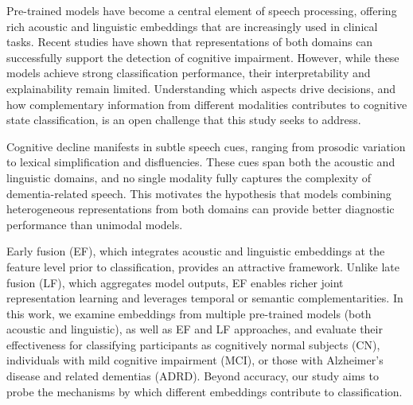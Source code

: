 \documentclass{article}
\begin{document}
{%




Pre-trained models have become a central element of speech processing, offering rich acoustic and linguistic embeddings that are increasingly used in clinical tasks. Recent studies have shown that representations of both domains can successfully support the detection of cognitive impairment. However, while these models achieve strong classification performance, their interpretability and explainability remain limited. Understanding which aspects drive decisions, and how complementary information from different modalities contributes to cognitive state classification, is an open challenge that this study seeks to address. %

Cognitive decline manifests in subtle speech cues, ranging from prosodic variation to lexical simplification and disfluencies. These cues span both the acoustic and linguistic domains, and no single modality fully captures the complexity of dementia-related speech. This motivates the hypothesis that models combining heterogeneous representations from both domains can provide better diagnostic performance than unimodal models. %

Early fusion (EF), which integrates acoustic and linguistic embeddings at the feature level prior to classification, provides an attractive framework. Unlike late fusion (LF), which aggregates model outputs, EF enables richer joint representation learning and leverages temporal or semantic complementarities. In this work, we examine embeddings from multiple pre-trained models (both acoustic and linguistic), as well as EF and LF approaches, and evaluate their effectiveness for classifying participants as cognitively normal subjects (CN), individuals with mild cognitive impairment (MCI), or those with Alzheimer's disease and related dementias (ADRD). Beyond accuracy, our study aims to probe the mechanisms by which different embeddings contribute to classification.

}
\end{document}
